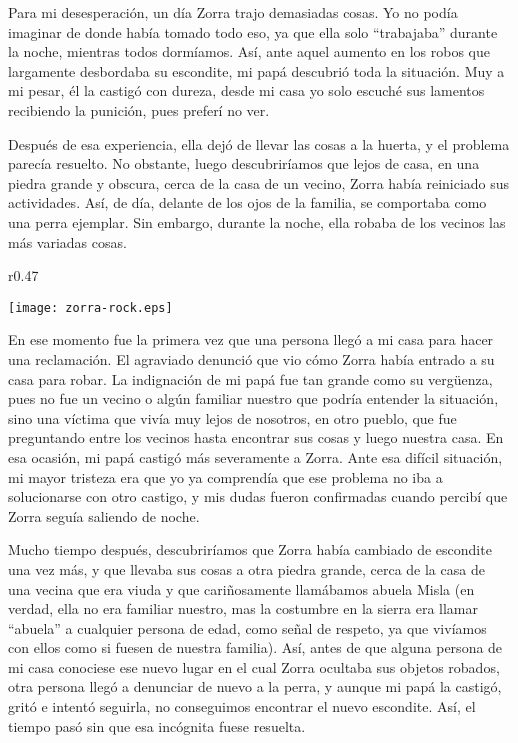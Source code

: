 Para mi desesperación, un día Zorra trajo demasiadas cosas. Yo no podía imaginar de donde había tomado todo eso, ya que ella solo ``trabajaba'' durante la noche, mientras todos dormíamos. Así, ante aquel aumento en los robos que largamente desbordaba su escondite, mi papá descubrió toda la situación.
Muy a mi pesar, él la castigó con dureza, desde mi casa yo solo escuché sus lamentos recibiendo la punición, pues preferí no ver.


Después de esa experiencia, ella dejó de llevar las cosas a la huerta, y el problema parecía resuelto. No obstante, luego descubriríamos que lejos de casa, en una piedra grande y obscura, cerca de la casa de un vecino, 
Zorra había reiniciado sus actividades. Así, de día, delante de los ojos de la familia, se comportaba como una perra ejemplar. Sin embargo, durante la noche, ella robaba de los vecinos las más variadas cosas.

\ifdefined\EnableIncludeImages
\begin{wrapfigure}{r}{0.47\textwidth}
  \begin{center}
  \vspace{-10pt}
    \texttt{[image: zorra-rock.eps]}
  \end{center}
  \vspace{-20pt}
\end{wrapfigure}
\fi
En ese momento fue la primera vez que una persona llegó a mi casa para hacer una reclamación. El agraviado denunció que vio cómo Zorra había entrado a su casa para robar.
La indignación de mi papá fue tan grande como su vergüenza, pues no fue un vecino o algún familiar nuestro que podría entender la situación, sino una víctima que vivía muy lejos de nosotros, en otro pueblo, que fue preguntando entre los vecinos hasta encontrar sus cosas y luego nuestra casa.
En esa ocasión, mi papá castigó más severamente a Zorra. Ante esa difícil situación, mi mayor tristeza era que yo ya comprendía que ese problema no iba a solucionarse con otro castigo, y mis dudas fueron confirmadas cuando percibí que Zorra seguía saliendo de noche.

Mucho tiempo después, descubriríamos que Zorra había cambiado de escondite una vez más, y que llevaba sus cosas a otra piedra grande, cerca de la casa de una vecina que era viuda y que cariñosamente llamábamos abuela Misla (en verdad, ella no era familiar nuestro, mas la costumbre en la sierra era llamar ``abuela'' a cualquier persona de edad, como señal de respeto, ya que vivíamos con ellos como si fuesen de nuestra familia).
Así, antes de que alguna persona de mi casa conociese ese nuevo lugar en el cual Zorra ocultaba sus objetos robados, otra persona llegó a denunciar de nuevo a la perra, y aunque mi papá la castigó, gritó e intentó seguirla, no conseguimos encontrar el nuevo escondite. Así, el tiempo pasó sin que esa incógnita fuese resuelta.


